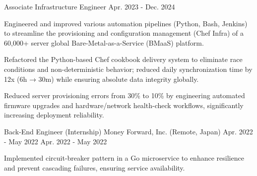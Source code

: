 \begin{cventries}
  \cventry
    {Associate Infrastructure Engineer} %
    {} %
    {} %
    {Apr. 2023 - Dec. 2024} %
    {
        \begin{cvitems}
        \item {Engineered and improved various automation pipelines (Python, Bash, Jenkins) to streamline the provisioning and configuration management (Chef Infra) of a 60,000+ server global Bare-Metal-as-a-Service (BMaaS) platform.}
        \item {Refactored the Python-based Chef cookbook delivery system to eliminate race conditions and non-deterministic behavior; reduced daily synchronization time by 12x (6h → 30m) while ensuring absolute data integrity globally.}
        \item {Reduced server provisioning errors from 30\% to 10\% by engineering automated firmware upgrades and hardware/network health-check workflows, significantly increasing deployment reliability.}
        \end{cvitems}
    }

  \cventry
    {Back-End Engineer (Internship)} %
    {Money Forward, Inc. (Remote, Japan)} %
    {Apr. 2022 - May 2022} %
    {Apr. 2022 - May 2022} %
    {
        \begin{cvitems}
        \item {Implemented circuit-breaker pattern in a Go microservice to enhance resilience and prevent cascading failures, ensuring service availability.}
        \end{cvitems}
    }



\end{cventries}
